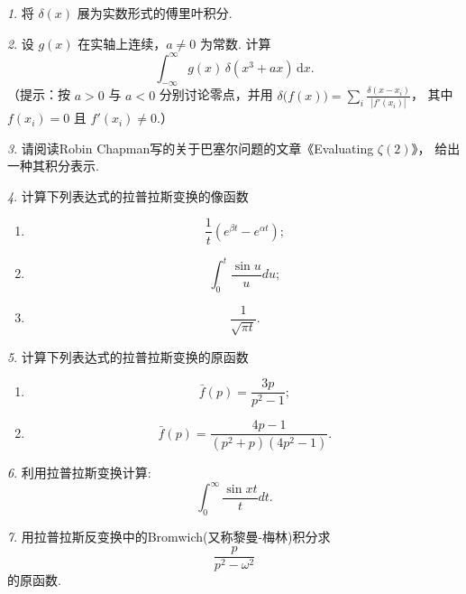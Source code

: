 \documentclass[11pt]{article}
\theoremstyle{remark}
\newtheorem{problem}{}
\begin{document}
\renewcommand{\labelenumi}{(\arabic{enumi})}
\renewcommand{\labelenumii}{(\arabic{enumi}.\arabic{enumii})}


\begin{problem}
  将 $\delta(x)$ 展为实数形式的傅里叶积分.
\end{problem}

\begin{problem}
  设 $g(x)$ 在实轴上连续，$a\neq 0$ 为常数. 计算
  $$
  \int_{-\infty}^{\infty} g(x)\,\delta\!\left(x^3+ax\right)\,\mathrm{d}x.
  $$
  （提示：按 $a>0$ 与 $a<0$ 分别讨论零点，并用
  $\displaystyle\delta\!\bigl(f(x)\bigr)
  =\sum_i\frac{\delta(x-x_i)}{|f'(x_i)|}$，
  其中 $f(x_i)=0$ 且 $f'(x_i)\neq 0$.）
\end{problem}

\begin{problem}
请阅读Robin Chapman写的关于巴塞尔问题的文章《Evaluating $\zeta(2)$》， 给出一种其积分表示.
\end{problem}


\begin{problem}
    计算下列表达式的拉普拉斯变换的像函数
    \begin{enumerate}
      \item $$
      \frac{1}{t}\left(e^{\beta t}-e^{\alpha t}\right) ;
      $$
      \item $$
      \int_0^t \frac{\sin u}{u} d u;
      $$
      \item 
      $$
      \frac{1}{\sqrt{\pi t}}.
      $$
    \end{enumerate}
\end{problem}

\begin{problem}
    计算下列表达式的拉普拉斯变换的原函数
    \begin{enumerate}
      \item $$
      \bar{f}(p)=\frac{3 p}{p^2-1} ;
      $$
      \item $$
      \bar{f}(p) = \frac{4 p-1}{\left(p^2+p\right)\left(4 p^2-1\right)}.
      $$
    \end{enumerate}
\end{problem}

\begin{problem}
    利用拉普拉斯变换计算:  $$\int_0^{\infty} \frac{\sin x t}{t} dt. $$
\end{problem}
   
\begin{problem}
用拉普拉斯反变换中的Bromwich(又称黎曼-梅林)积分求
$$
\frac{p}{p^2 - \omega^2}
$$
的原函数.
\end{problem}
\end{document}
